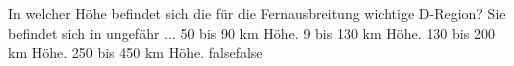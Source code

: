     {In welcher Höhe befindet sich die für die Fernausbreitung wichtige D-Region? Sie befindet sich in ungefähr ...}
    {50 bis 90 km Höhe.}
    {9 bis 130 km Höhe.}
    {130 bis 200 km Höhe.}
    {250 bis 450 km Höhe.}
    {false}{false}